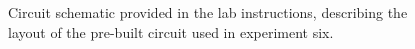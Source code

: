 \begin{figure}[H]
	\centering
	
	\parbox{.6\textwidth}{
	\caption[Digital-to-Analog IC schematic]{Circuit schematic provided in the
	lab instructions, describing the layout of the pre-built circuit used in
	experiment six.}
	\label{fig:dacSchem}}
\end{figure}
